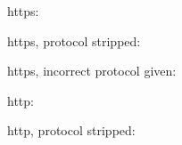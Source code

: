\documentclass{ltugboat}
\begin{document}
https: 

https, protocol stripped: 

https, incorrect protocol given: 

http: 

http, protocol stripped: 

\loggingall
\end{document}
